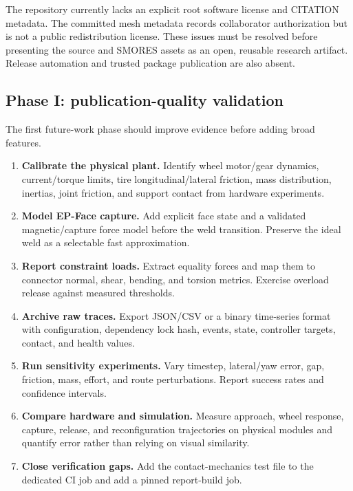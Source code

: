 The repository currently lacks an explicit root software license and CITATION metadata.
The committed mesh metadata records collaborator authorization but is not a public
redistribution license. These issues must be resolved before presenting the source and
SMORES assets as an open, reusable research artifact. Release automation and trusted
package publication are also absent.

\subsection{Phase I: publication-quality validation}

The first future-work phase should improve evidence before adding broad features.

\begin{enumerate}
  \item \textbf{Calibrate the physical plant.} Identify wheel motor/gear dynamics,
        current/torque limits, tire longitudinal/lateral friction, mass distribution,
        inertias, joint friction, and support contact from hardware experiments.
  \item \textbf{Model EP-Face capture.} Add explicit face state and a validated
        magnetic/capture force model before the weld transition. Preserve the ideal
        weld as a selectable fast approximation.
  \item \textbf{Report constraint loads.} Extract \mujoco{} equality forces and map
        them to connector normal, shear, bending, and torsion metrics. Exercise
        overload release against measured thresholds.
  \item \textbf{Archive raw traces.} Export JSON/CSV or a binary time-series format with
        configuration, dependency lock hash, events, state, controller targets, contact,
        and health values.
  \item \textbf{Run sensitivity experiments.} Vary timestep, lateral/yaw error, gap,
        friction, mass, effort, and route perturbations. Report success rates and
        confidence intervals.
  \item \textbf{Compare hardware and simulation.} Measure approach, wheel response,
        capture, release, and reconfiguration trajectories on physical modules and
        quantify error rather than relying on visual similarity.
  \item \textbf{Close verification gaps.} Add the contact-mechanics test file to the
        dedicated \mujoco{} CI job and add a pinned report-build job.
\end{enumerate}

